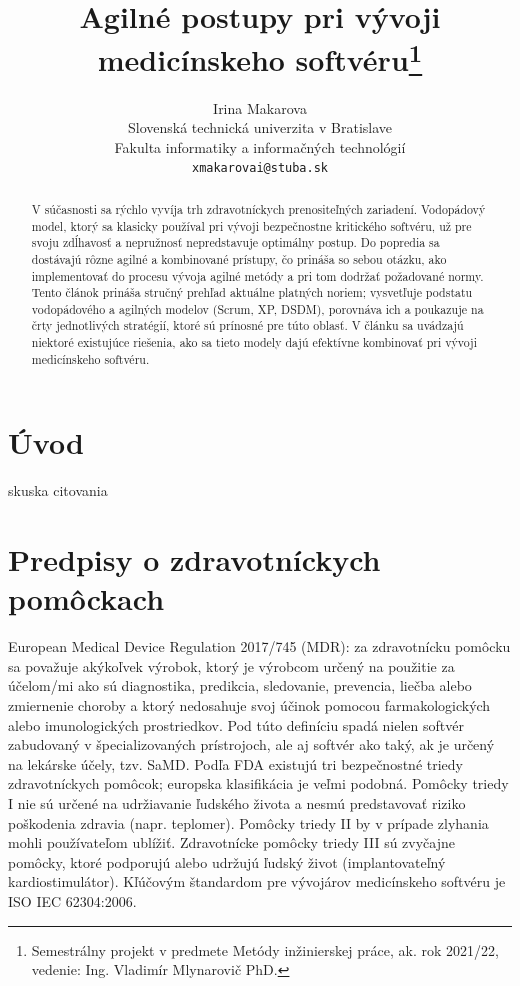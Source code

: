 \documentclass[10pt,twoside,slovak,a4paper]{article}
\title{Agilné postupy pri vývoji medicínskeho softvéru\thanks{Semestrálny projekt v predmete Metódy inžinierskej práce, ak. rok 2021/22, vedenie: Ing. Vladimír Mlynarovič PhD.}}
\author{Irina Makarova\\[2pt]
	{\small Slovenská technická univerzita v Bratislave}\\
	{\small Fakulta informatiky a informačných technológií}\\
	{\small \texttt{xmakarovai@stuba.sk}}
	}
\begin{document}
\renewcommand{\abstractname}{\vspace{-\baselineskip}} %
\maketitle

\begin{abstract}
V súčasnosti sa rýchlo vyvíja trh zdravotníckych prenositeľných zariadení. Vodopádový model, ktorý sa klasicky používal pri vývoji bezpečnostne kritického softvéru, už pre svoju zdĺhavosť a nepružnosť nepredstavuje optimálny postup. Do popredia sa dostávajú rôzne agilné a kombinované prístupy, čo prináša so sebou otázku, ako implementovať do procesu vývoja agilné metódy a pri tom dodržať požadované normy. Tento článok prináša stručný prehľad aktuálne platných noriem; vysvetľuje podstatu vodopádového a agilných modelov (Scrum, XP, DSDM), porovnáva ich a poukazuje na črty jednotlivých stratégií, ktoré sú prínosné pre túto oblasť. V článku sa uvádzajú niektoré existujúce riešenia, ako sa tieto modely dajú efektívne kombinovať pri vývoji medicínskeho softvéru.
\end{abstract}

\section{Úvod} 

skuska citovania\cite{mccaffery2019}

\section{Predpisy o zdravotníckych pomôckach}
European Medical Device Regulation 2017/745 (MDR): za zdravotnícku pomôcku sa považuje akýkoľvek výrobok, ktorý je výrobcom určený na použitie za účelom/mi ako sú diagnostika, predikcia, sledovanie, prevencia, liečba alebo zmiernenie choroby a ktorý nedosahuje svoj účinok pomocou farmakologických alebo imunologických prostriedkov. Pod túto definíciu spadá nielen softvér zabudovaný v špecializovaných prístrojoch, ale aj softvér ako taký, ak je určený na lekárske účely, tzv. SaMD. Podľa FDA existujú tri bezpečnostné triedy zdravotníckych pomôcok; europska klasifikácia je veľmi podobná. Pomôcky triedy I nie sú určené na udržiavanie ľudského života a nesmú predstavovať riziko poškodenia zdravia (napr. teplomer). Pomôcky triedy II by v prípade zlyhania mohli používateľom ublížiť. Zdravotnícke pomôcky triedy III sú zvyčajne pomôcky, ktoré podporujú alebo udržujú ľudský život (implantovateľný kardiostimulátor).
Kľúčovým štandardom pre vývojárov medicínskeho softvéru je ISO IEC 62304:2006\cite{bronneke2021}.
\end{document}
